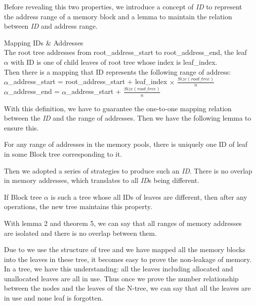\documentclass[runningheads]{llncs}
\begin{document}
Before revealing this two properties, we introduce a concept of \textsl{ID} to represent the address range of a memory block and a lemma to maintain the relation between \textsl{ID} and address range.

\begin{definition} {Mapping IDs $\&$ Addresses} \\
The root tree addresses from root\_address\_start to root\_address\_end, the leaf $\alpha$ with ID is one of child leaves of root tree whose index is leaf\_index. \\
Then there is a mapping that ID represents the following range of address: \\
$\alpha$\_address\_start = root\_address\_start + leaf\_index $\times$ $\frac{Size (root\_tree)}{n}$ \\
$\alpha$\_address\_end = $\alpha$\_address\_start + $\frac{Size (root\_tree)}{n}$
\end{definition}

With this definition, we have to guarantee the one-to-one mapping relation between the \textsl{ID} and the range of addresses. Then we have the following lemma to ensure this.

\begin{lemma}
For any range of addresses in the memory pools, there is uniquely one ID of leaf in some Block tree corresponding to it.
\end{lemma}

Then we adopted a series of strategies to produce such an \textsl{ID}. There is no overlap in memory addresses, which translates to all \textsl{ID}s being different.

\begin{theorem}
If Block tree $\alpha$ is such a tree whose all IDs of leaves are different, then after any operations, the new tree maintains this property.
\end{theorem}

With lemma 2 and theorem 5, we can say that all ranges of memory addresses are isolated and there is no overlap between them.

Due to we use the structure of tree and we have mapped all the memory blocks into the leaves in these tree, it becomes easy to prove the non-leakage of memory. In a tree, we have this understanding: all the leaves including allocated and unallocated leaves are all in use. Thus once we prove the number relationship between the nodes and the leaves of the N-tree, we can say that all the leaves are in use and none leaf is forgotten.
\end{document}
